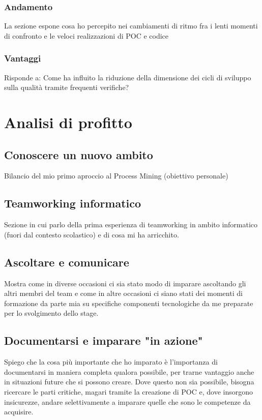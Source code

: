 \subsubsection{Andamento}
La sezione espone cosa ho percepito nei cambiamenti di ritmo fra i lenti momenti di confronto e le veloci realizzazioni di POC e codice
\subsubsection{Vantaggi}
Risponde a: Come ha influito la riduzione della dimensione dei cicli di sviluppo sulla qualità tramite frequenti verifiche?
\section{Analisi di profitto}
\subsection{Conoscere un nuovo ambito}
Bilancio del mio primo aproccio al Process Mining (obiettivo personale)

\subsection{Teamworking informatico}
Sezione in cui parlo della prima esperienza di teamworking in ambito informatico (fuori dal contesto scolastico) e di cosa mi ha arricchito.

\subsection{Ascoltare e comunicare}
Mostra come in diverse occasioni ci sia stato modo di imparare ascoltando gli altri membri del team e come in altre occasioni ci siano stati dei momenti di formazione da parte mia su specifiche componenti tecnologiche da me preparate per lo svolgimento dello stage.

\subsection{Documentarsi e imparare "in azione"}
Spiego che la cosa più importante che ho imparato è l'importanza di documentarsi in maniera completa qualora possibile, per trarne vantaggio anche in situazioni future che si possono creare. Dove questo non sia possibile, bisogna ricercare le parti critiche, magari tramite la creazione di POC e, dove insorgono insicurezze, andare selettivamente a imparare quelle che sono le competenze da acquisire.

